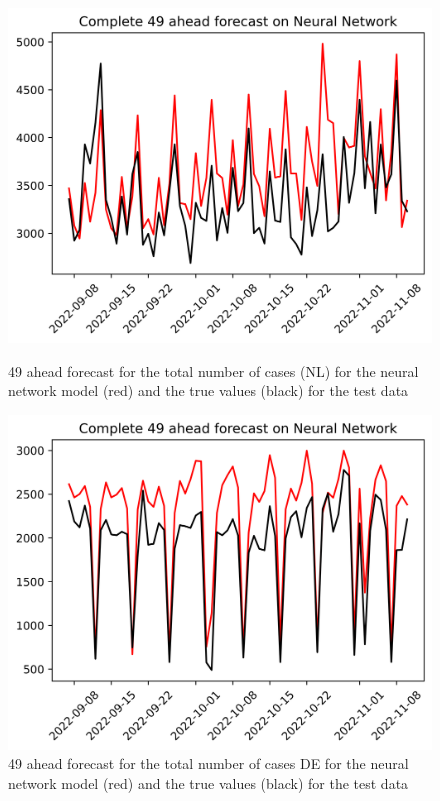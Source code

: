 \begin{figure}

\begin{minipage}{.45\textwidth}
  \centering
  \includegraphics[width=\linewidth]{pics/49_ah/Complete_49_ahead_Neural Network.png}
  \caption{49 ahead forecast for the total number of cases (NL) for the neural network model (red) and the true values (black) for the test data}
  \label{fig:tot_cases_fc_49_nn}
\end{minipage}
\begin{minipage}{.45\textwidth}
  \centering
  \includegraphics[width=\linewidth]{pics/49_ah/DE_Complete_49_ahead_Neural Network.png}
  \caption{49 ahead forecast for the total number of cases DE for the neural network model (red) and the true values (black) for the test data}
  \label{fig:tot_cases_fc_49_nn_DE}
\end{minipage}

\end{figure}
